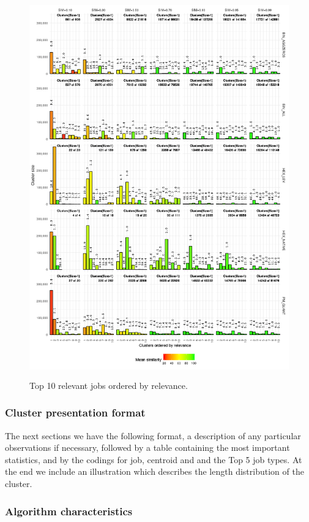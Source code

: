 \documentclass[]{llncs}
\begin{document}
\begin{figure}
  \centering
   \includegraphics[width=4.61in,height=6.44in]{./media/image11.png}
   \caption{Top 10 relevant jobs ordered by relevance.}
   \label{fig:top10_relevant_jobs}
\end{figure}

\subsubsection{Cluster presentation format}
The next sections we have the following format, a description of any particular observations if necessary, followed by a table containing the most important statistics, and by the codings for job, centroid and and the Top 5 job types.
At the end we include an illustration which describes the length distribution of the cluster.
\subsubsection{Algorithm characteristics}
\end{document}

